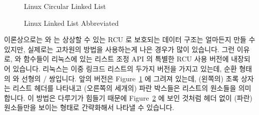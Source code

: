 \begin{figure}[tb]
\begin{center}
\end{center}
\caption{Linux Circular Linked List}
\label{fig:defer:Linux Circular Linked List}
\end{figure}

\begin{figure}[tb]
\centering
{}
\caption{Linux Linked List Abbreviated}
\label{fig:defer:Linux Linked List Abbreviated}
\end{figure}

이론상으로는  와  는 상상할 수
있는 RCU 로 보호되는 데이터 구조는 얼마든지 만들 수 있지만, 실제로는
고차원의 방법을 사용하는게 나은 경우가 많이 있습니다.
그런 이유로,  와  함수들이
리눅스에 있는 리스트 조정 API 의 특별한 RCU 사용 버전에 내장되어 있습니다.
리눅스는 이중 링크드 리스트의 두가지 버전을 가지고 있는데, 순환 형태의
 와 선형의 /
쌍입니다.
앞의 버전은
Figure~\ref{fig:defer:Linux Circular Linked List} 에 그려져 있는데, (왼쪽의)
초록 상자는 리스트 헤더를 나타내고 (오른쪽의 세개의) 파란 박스들은 리스트의
원소들을 의미합니다.
이 방법은 다루기가 힘들기 때문에
Figure~\ref{fig:defer:Linux Linked List Abbreviated} 에 보인 것처럼 헤더 없이
(파란) 원소들만을 보이는 형태로 간략화해서 나타낼 수 있습니다.

